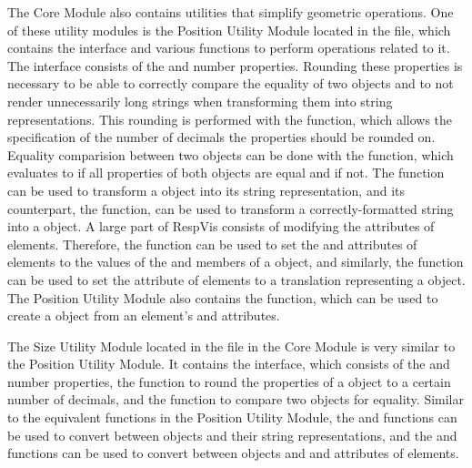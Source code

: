 The Core Module also contains utilities that simplify geometric
operations.  One of these utility modules is the Position Utility
Module located in the  file, which
contains the  interface and various functions to
perform operations related to it.  The  interface
consists of the  and  number properties.  Rounding
these properties is necessary to be able to correctly compare the
equality of two  objects and to not render
unnecessarily long strings when transforming them into string
representations.  This rounding is performed with the
 function, which allows the specification of the
number of decimals the properties should be rounded on.  Equality
comparision between two  objects can be done with the
 function, which evaluates to  if all
properties of both  objects are equal and 
if not.  The  function can be used to transform
a  object into its  string
representation, and its counterpart, the 
function, can be used to transform a correctly-formatted string into a
 object.  A large part of RespVis consists of modifying
the attributes of elements.  Therefore, the 
function can be used to set the  and  attributes of
elements to the values of the  and  members of a
 object, and similarly, the
 function can be used to set the
 attribute of elements to a translation representing a
 object.  The Position Utility Module also contains the
 function, which can be used to create a
 object from an element's  and 
attributes.

The Size Utility Module located in the  file
in the Core Module is very similar to the Position Utility Module.  It
contains the  interface, which consists of the 
and  number properties, the  function to
round the properties of a  object to a certain number of
decimals, and the  function to compare two
 objects for equality.  Similar to the equivalent functions
in the Position Utility Module, the  and
 functions can be used to convert between
 objects and their string representations, and the
 and  functions can be used to
convert between  objects and  and 
attributes of elements.

